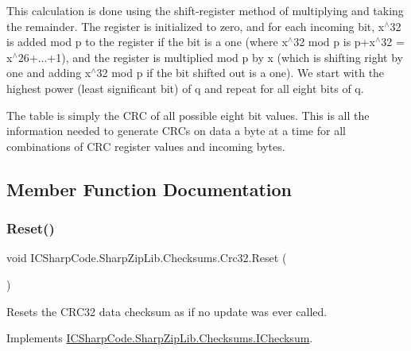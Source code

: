 This calculation is done using the shift-\/register method of multiplying and taking the remainder. The register is initialized to zero, and for each incoming bit, x$^\wedge$32 is added mod p to the register if the bit is a one (where x$^\wedge$32 mod p is p+x$^\wedge$32 = x$^\wedge$26+...+1), and the register is multiplied mod p by x (which is shifting right by one and adding x$^\wedge$32 mod p if the bit shifted out is a one). We start with the highest power (least significant bit) of q and repeat for all eight bits of q.

The table is simply the C\+RC of all possible eight bit values. This is all the information needed to generate C\+RC\textquotesingle{}s on data a byte at a time for all combinations of C\+RC register values and incoming bytes. 

\subsection{Member Function Documentation}
\mbox{\label{class_i_c_sharp_code_1_1_sharp_zip_lib_1_1_checksums_1_1_crc32_a6d0a7a926c3b6f8aea03897a2dc40b07}} 
\subsubsection{\texorpdfstring{Reset()}{Reset()}\hspace{0.1cm}{\footnotesize\ttfamily [1/2]}}
{\footnotesize\ttfamily void I\+C\+Sharp\+Code.\+Sharp\+Zip\+Lib.\+Checksums.\+Crc32.\+Reset (\begin{DoxyParamCaption}{ }\end{DoxyParamCaption})\hspace{0.3cm}{\ttfamily [inline]}}



Resets the C\+R\+C32 data checksum as if no update was ever called. 



Implements \hyperlink{interface_i_c_sharp_code_1_1_sharp_zip_lib_1_1_checksums_1_1_i_checksum_a43ef0e6e9e22a503da94790835a0a384}{I\+C\+Sharp\+Code.\+Sharp\+Zip\+Lib.\+Checksums.\+I\+Checksum}.

